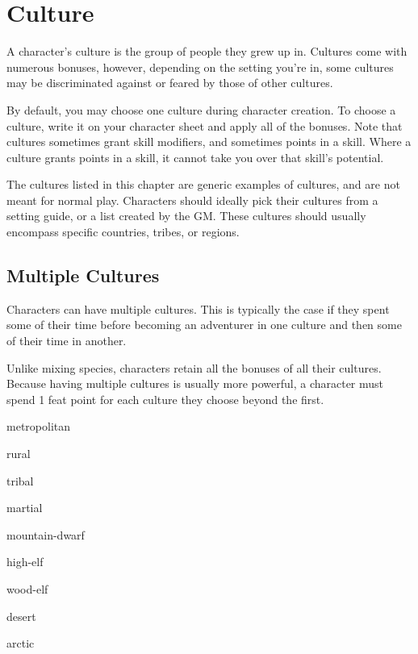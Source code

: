 \chapter{Culture}\label{culture}

\begin{multicols*}{2}
    A character's culture is the group of people they grew up in. Cultures come
    with numerous bonuses, however, depending on the setting you're in, some
    cultures may be discriminated against or feared by those of other cultures.

    By default, you may choose one culture during character creation. To choose a
    culture, write it on your character sheet and apply all of the bonuses. Note
    that cultures sometimes grant skill modifiers, and sometimes points in a skill.
    Where a culture grants points in a skill, it cannot take you over that skill's
    potential.

    The cultures listed in this chapter are generic examples of cultures, and are
    not meant for normal play. Characters should ideally pick their cultures from
    a setting guide, or a list created by the GM. These cultures should usually
    encompass specific countries, tribes, or regions.

    \section{Multiple Cultures}
    Characters can have multiple cultures. This is typically the case if they spent
    some of their time before becoming an adventurer in one culture and then some
    of their time in another.

    Unlike mixing species, characters retain all the bonuses of all their cultures.
    Because having multiple cultures is usually more powerful, a character must
    spend 1 feat point for each culture they choose beyond the first.

    {metropolitan}

    {rural}

    {tribal}

    {martial}

    {mountain-dwarf}

    {high-elf}

    {wood-elf}

    {desert}

    {arctic}
\end{multicols*}
